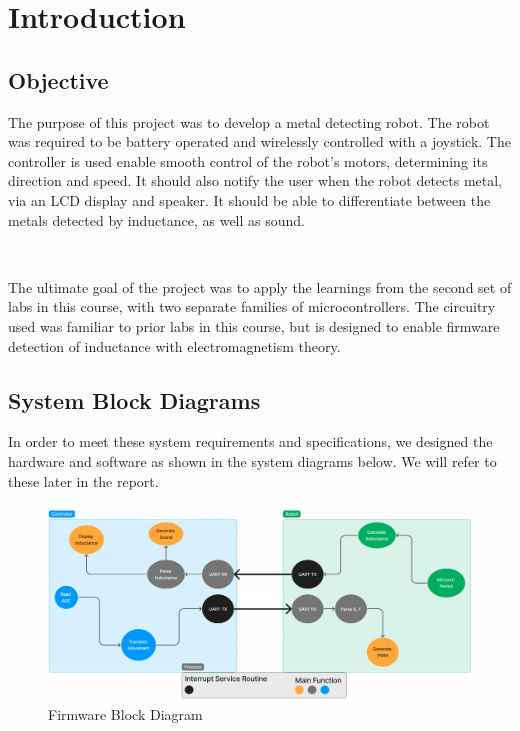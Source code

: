 \documentclass{article}
\begin{document}
\newpage

\tableofcontents

\newpage
\section{Introduction}

\subsection{Objective}

The purpose of this project was to develop a metal detecting robot. The robot was required to be
battery operated and wirelessly controlled with a joystick. The controller is used enable smooth control of the robot's
motors, determining its direction and speed. It should also notify the user when the robot detects metal, via an LCD
display and speaker. It should be able to differentiate between the metals detected by inductance, as well as sound.

\

The ultimate goal of the project was to apply the learnings from the second set of labs in this course, with two separate families of microcontrollers.
The circuitry used was familiar to prior labs in this course, but is designed to enable firmware detection of inductance with electromagnetism theory.

\subsection{System Block Diagrams}

In order to meet these system requirements and specifications, we designed the hardware and software as shown in the system diagrams below.
We will refer to these later in the report.

\begin{figure}[h]
    \centering
    \includegraphics[width=1\linewidth]{Figures/Firmware_Block_Diagram.png}
    \caption{Firmware Block Diagram}
    \label{fig:firmware_block_diagram}
\end{figure}
\end{document}
